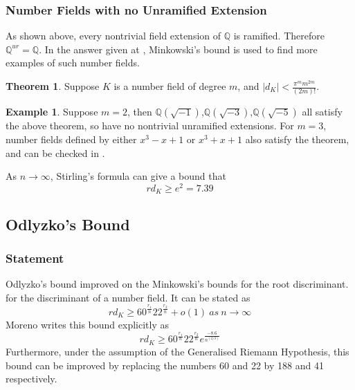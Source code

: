 \documentclass[12pt]{extarticle}
\newcommand{\Q}{\mathbb{Q}}
\newcommand{\<}{\langle}
\renewcommand{\>}{\rangle}
\theoremstyle{definition}
\newtheorem{theorem}{Theorem}
\newtheorem*{example}{Example}
\begin{document}
\subsubsection*{Number Fields with no Unramified Extension}
As shown above, every nontrivial field extension of $\Q$ is ramified. Therefore $\Q^{ur} = \Q$. In the answer given at \cite{CONRAD}, Minkowski's bound is used to find more examples of such number fields.
\begin{theorem}
Suppose $K$ is a number field of degree $m$, and $|d_K| < \frac{\pi^m m^{2m}}{(2m)!} $. 
\end{theorem}
\begin{example}
Suppose $m=2$, then $\Q(\sqrt{-1})$,$\Q(\sqrt{-3})$,$\Q(\sqrt{-5})$ all satisfy the above theorem, so have no nontrivial unramified extensions. For $m=3$, number fields defined by either $x^3-x+1$ or $x^3+x+1$ also satisfy the theorem, and can be checked in \cite{JONE2}. 
\end{example}
As $n\rightarrow \infty$, Stirling's formula can give a bound that
\begin{equation}
    rd_K\geqslant e^2 = 7.39
\end{equation}
\subsection{Odlyzko's Bound}
\subsubsection*{Statement}
Odlyzko's bound \cite{ODL1990} improved on the Minkowski's bounds for the root discriminant. for the discriminant of a number field. It can be stated as  
\begin{equation}
rd_K\geqslant 60^{\frac{r_1}{n}}22^{\frac{r_2}{n}}+o(1)\:as\:n\rightarrow \infty   
\end{equation}
Moreno writes this bound explicitly as 
\begin{equation}
rd_K\geqslant 60^{\frac{r_1}{n}}22^{\frac{r_2}{n}}e^\frac{-8.6}{n^(2/3)}
\end{equation}
Furthermore, under the assumption of the Generalised Riemann Hypothesis, 
this bound can be improved by replacing the numbers 60 and 22 by 188 and 41 respectively. 
\end{document}
